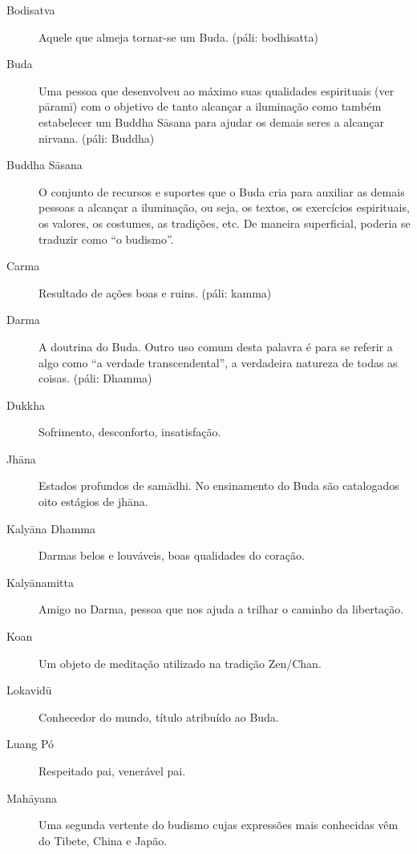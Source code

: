 \begin{description}
  \item[Bodisatva] Aquele que almeja tornar-se um Buda. (páli: bodhisatta)

  \item[Buda] Uma pessoa que desenvolveu ao máximo suas qualidades espirituais (ver pāramī) com o objetivo de tanto alcançar a iluminação como também estabelecer um Buddha Sāsana para ajudar os demais seres a alcançar nirvana. (páli: Buddha)

  \item[Buddha Sāsana] O conjunto de recursos e suportes que o Buda cria para auxiliar as demais pessoas a alcançar a iluminação, ou seja, os textos, os exercícios espirituais, os valores, os costumes, as tradições, etc. De maneira superficial, poderia se traduzir como “o budismo”.

  \item[Carma] Resultado de ações boas e ruins. (páli: kamma)

  \item[Darma] A doutrina do Buda. Outro uso comum desta palavra é para se referir a algo como “a verdade transcendental”, a verdadeira natureza de todas as coisas. (páli: Dhamma)

  \item[Dukkha] Sofrimento, desconforto, insatisfação. 

  \item[Jhāna] Estados profundos de samādhi. No ensinamento do Buda são catalogados oito estágios de jhāna.

  \item[Kalyāna Dhamma] Darmas belos e louváveis, boas qualidades do coração. 

  \item[Kalyānamitta] Amigo no Darma, pessoa que nos ajuda a trilhar o caminho da libertação.

  \item[Koan] Um objeto de meditação utilizado na tradição Zen/Chan.

  \item[Lokavidū] Conhecedor do mundo, título atribuído ao Buda.

  \item[Luang Pó] Respeitado pai, venerável pai.

  \item[Mahāyana] Uma segunda vertente do budismo cujas expressões mais conhecidas vêm do Tibete, China e Japão.


\end{description}
